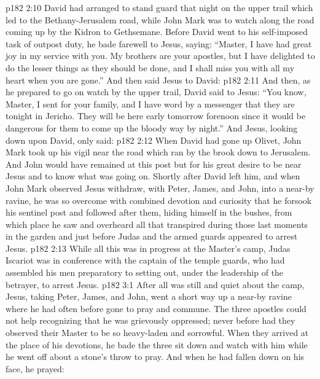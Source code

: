 \vs p182 2:10 \pc David had arranged to stand guard that night on the upper trail which led to the Bethany\hyp{}Jerusalem road, while John Mark was to watch along the road coming up by the Kidron to Gethsemane. Before David went to his self\hyp{}imposed task of outpost duty, he bade farewell to Jesus, saying: “Master, I have had great joy in my service with you. My brothers are your apostles, but I have delighted to do the lesser things as they should be done, and I shall miss you with all my heart when you are gone.” And then said Jesus to David: 
\vs p182 2:11 And then, as he prepared to go on watch by the upper trail, David said to Jesus: “You know, Master, I sent for your family, and I have word by a messenger that they are tonight in Jericho. They will be here early tomorrow forenoon since it would be dangerous for them to come up the bloody way by night.” And Jesus, looking down upon David, only said: 
\vs p182 2:12 \pc When David had gone up Olivet, John Mark took up his vigil near the road which ran by the brook down to Jerusalem. And John would have remained at this post but for his great desire to be near Jesus and to know what was going on. Shortly after David left him, and when John Mark observed Jesus withdraw, with Peter, James, and John, into a near\hyp{}by ravine, he was so overcome with combined devotion and curiosity that he forsook his sentinel post and followed after them, hiding himself in the bushes, from which place he saw and overheard all that transpired during those last moments in the garden and just before Judas and the armed guards appeared to arrest Jesus.
\vs p182 2:13 \pc While all this was in progress at the Master’s camp, Judas Iscariot was in conference with the captain of the temple guards, who had assembled his men preparatory to setting out, under the leadership of the betrayer, to arrest Jesus.
\vs p182 3:1 After all was still and quiet about the camp, Jesus, taking Peter, James, and John, went a short way up a near\hyp{}by ravine where he had often before gone to pray and commune. The three apostles could not help recognizing that he was grievously oppressed; never before had they observed their Master to be so heavy\hyp{}laden and sorrowful. When they arrived at the place of his devotions, he bade the three sit down and watch with him while he went off about a stone’s throw to pray. And when he had fallen down on his face, he prayed: 
